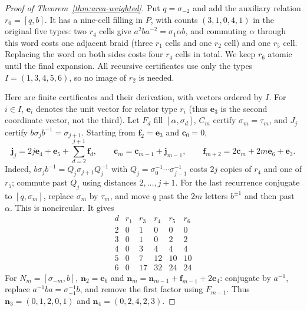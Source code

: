 \documentclass[11pt,a4paper]{article}
\theoremstyle{plain}
\theoremstyle{definition}
\theoremstyle{remark}
\begin{document}
\begin{proof}[Proof of Theorem~\ref{thm:area-weighted}]
Put $q=\sigma_{-2}$ and add the auxiliary relation $r_6=[q,b]$. It has a nine-cell filling in $P$, with counts
$(3,1,0,4,1)$ in the original five types: two $r_4$ cells give $a^2ba^{-2}=\sigma_1\alpha b$, and commuting $\alpha$ through
this word costs one adjacent braid (three $r_1$ cells and one $r_2$ cell) and one $r_5$ cell. Replacing the word on both sides costs four
$r_4$ cells in total. We keep $r_6$ atomic until the final expansion. All recursive certificates use only the types
$I=(1,3,4,5,6)$, so no image of $r_2$ is needed.

Here are finite certificates and their derivation, with vectors ordered by $I$. For $i\in I$, $\mathbf e_i$ denotes the unit vector for relator type $r_i$
(thus $\mathbf e_3$ is the second coordinate vector, not the third). Let $F_d$ fill $[\alpha,\sigma_d]$, $C_m$ certify
$\sigma_m=\tau_m$, and $J_j$ certify $b\sigma_jb^{-1}=\sigma_{j+1}$. Starting from $\mathbf f_2=\mathbf e_3$ and $\mathbf c_0=0$,
\[
\mathbf j_j=2j\mathbf e_4+\mathbf e_5+\sum_{d=2}^{j+1}\mathbf f_d,\qquad
\mathbf c_m=\mathbf c_{m-1}+\mathbf j_{m-1},\qquad
\mathbf f_{m+2}=2\mathbf c_m+2m\mathbf e_6+\mathbf e_3.
\]
Indeed, $b\sigma_jb^{-1}=Q_j\sigma_{j+1}Q_j^{-1}$ with $Q_j=\sigma_0^{-1}\cdots\sigma_{j-1}^{-1}$ costs $2j$ copies of $r_4$ and
one of $r_5$; commute past $Q_j$ using distances $2,\ldots,j+1$. For the last recurrence conjugate to $[q,\sigma_m]$, replace
$\sigma_m$ by $\tau_m$, and move $q$ past the $2m$ letters $b^{\pm1}$ and then past $\alpha$. This is noncircular. It gives
\[
\begin{array}{c|rrrrr}
d& r_1&r_3&r_4&r_5&r_6\\\hline
2&0&1&0&0&0\\3&0&1&0&2&2\\4&0&3&4&4&4\\5&0&7&12&10&10\\6&0&17&32&24&24
\end{array}
\]
For $N_m=[\sigma_{-m},b]$, $\mathbf n_2=\mathbf e_6$ and
$\mathbf n_m=\mathbf n_{m-1}+\mathbf f_{m-1}+2\mathbf e_4$: conjugate by $a^{-1}$, replace $a^{-1}ba=\sigma_{-1}^{-1}b$, and remove
the first factor using $F_{m-1}$. Thus $\mathbf n_3=(0,1,2,0,1)$ and $\mathbf n_4=(0,2,4,2,3)$.


\end{proof}
\end{document}
